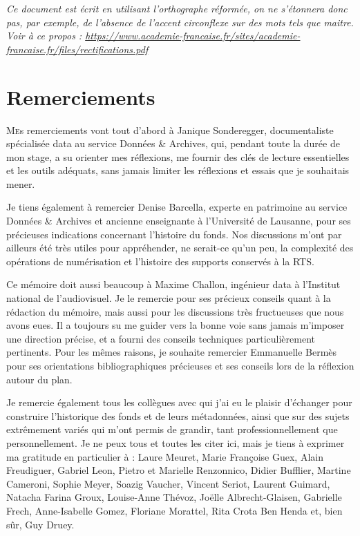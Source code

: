 \documentclass[a4paper,12pt,twoside]{book}
\begin{document}
	\textit{Ce document est écrit en utilisant l'orthographe réformée, on ne s'étonnera donc pas, par exemple, de l'absence de l'accent circonflexe sur des mots tels que maitre.
		Voir à ce propos : \url{https://www.academie-francaise.fr/sites/academie-francaise.fr/files/rectifications.pdf}}
	\newpage{\pagestyle{empty}\cleardoublepage}
	
	\chapter{Remerciements}
	
	\lettrine{M}es remerciements vont tout d’abord à Janique Sonderegger, documentaliste spécialisée data au service Données \& Archives, qui, pendant toute la durée de mon stage, a su orienter mes réflexions, me fournir des clés de lecture essentielles et les outils adéquats, sans jamais limiter les réflexions et essais que je souhaitais mener.
	
	Je tiens également à remercier Denise Barcella, experte en patrimoine au service Données \& Archives et ancienne enseignante à l’Université de Lausanne, pour ses précieuses indications concernant l’histoire du fonds. Nos discussions m’ont par ailleurs été très utiles pour appréhender, ne serait-ce qu’un peu, la complexité des opérations de numérisation et l’histoire des supports conservés à la RTS.
	
	Ce mémoire doit aussi beaucoup à Maxime Challon, ingénieur data à l’Institut national de l’audiovisuel. Je le remercie pour ses précieux conseils quant à la rédaction du mémoire, mais aussi pour les discussions très fructueuses que nous avons eues. Il a toujours su me guider vers la bonne voie sans jamais m’imposer une direction précise, et a fourni des conseils techniques particulièrement pertinents. Pour les mêmes raisons, je souhaite remercier Emmanuelle Bermès pour ses orientations bibliographiques précieuses et ses conseils lors de la réflexion autour du plan.
	
	Je remercie également tous les collègues avec qui j’ai eu le plaisir d’échanger pour construire l’historique des fonds et de leurs métadonnées, ainsi que sur des sujets extrêmement variés qui m’ont permis de grandir, tant professionnellement que personnellement. Je ne peux tous et toutes les citer ici, mais je tiens à exprimer ma gratitude en particulier à : Laure Meuret, Marie Françoise Guex, Alain Freudiguer, Gabriel Leon, Pietro et Marielle Renzonnico, Didier Bufflier, Martine Cameroni, Sophie Meyer, Soazig Vaucher, Vincent Seriot, Laurent Guimard, Natacha Farina Groux, Louise-Anne Thévoz, Joëlle Albrecht-Glaisen, Gabrielle Frech, Anne-Isabelle Gomez, Floriane Morattel, Rita Crota Ben Henda et, bien sûr, Guy Druey.
	
\end{document}
